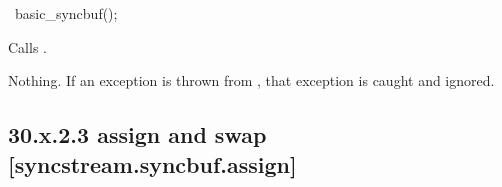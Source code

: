 \documentclass[ebook,11pt,article]{memoir}
\begin{document}
%
\begin{addedblock}
\begin{itemdecl}
~basic_syncbuf();
\end{itemdecl}

\begin{itemdescr}
\pnum
\effects
Calls .

\pnum
\throws
Nothing. 
If an exception is thrown from , that exception is caught and ignored.

\end{itemdescr}

\end{addedblock}

\subsection{30.x.2.3  assign and swap [syncstream.syncbuf.assign]}

\end{document}

